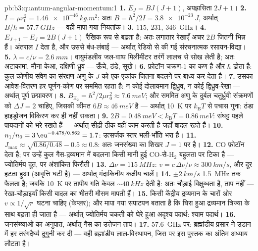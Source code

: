 \begin{solution}{pb:b3:quantum-angular-momentum:1}
\textbf{1.} $E_J = BJ(J+1)$, अपह्रासिता $2J + 1$।
\textbf{2.} $I = \mu r_0^2 = \qty{1.46e-46}{kg.m^2}$: अतः $B =
\hbar^2/2I = \qty{3.8e-23}{J}$, अर्थात् $B/h = \qty{57.7}{GHz}$ ---
वही मापा गया नियतांक।
\textbf{3.} $115$, $231$, \qty{346}{GHz}।
\textbf{4.} $E_{J+1} - E_J = 2B(J+1)$ रैखिक रूप से बढ़ता है: अतः
लगातार रेखाएँ अचर $2B$ जितनी भिन्न हैं। अंतराल $I$ देता है, और उससे
बंध-लंबाई --- अर्थात् रेडियो से की गई संरचनात्मक रसायन-विद्या।
\textbf{5.} $\lambda = c/\nu = \qty{2.6}{mm}$। वायुमंडलीय जल-वाष्प
मिलीमीटर तरंगें लालच से सोख लेती है; अतः अटाकामा, मौना केआ,
दक्षिणी ध्रुव --- ऊँचे, ठंडे, सूखे।
\textbf{6.} फ़ोटॉन चक्रण-$1$ का कण है और $\hbar$ ढोता है:
कुल कोणीय संवेग का संरक्षण अणु के $J$ को एक एकांक जितना बदलने पर
बाध्य कर देता है।
\textbf{7.} उसका आवेश-वितरण हर घूर्णन-कोण पर सममित रहता है: न कोई
दोलायमान द्विध्रुव, न कोई द्विध्रुव-रेखा --- अर्थात् पूर्ण
छद्मावरण।
\textbf{8.} $B_{\text{H}_2} = \hbar^2/2\mu r_0^2 \approx
\qty{7.6}{meV}$; और सममित अणु के दुर्बल चतुर्ध्रुवी
संक्रमणों को $\Delta J = 2$ चाहिए, जिसकी कीमत $6B \approx
\qty{46}{meV}$ है --- अर्थात् \qty{10}{K} पर $k_{\text{B}}T$ से पचास
गुना: ठंडा हाइड्रोजन विकिरण कर ही नहीं सकता।
\textbf{9.} $2B = \qty{0.48}{meV} < k_{\text{B}}T = \qty{0.86}{meV}$:
संघट्ट पहले पायदानों को भरे रखते हैं --- अर्थात् सीढ़ी ठीक वहीं काम
करती है जहाँ बादल रहते हैं।
\textbf{10.} $n_1/n_0 = 3\,\eu^{-0.478/0.862} = 1.7$: उत्सर्जक
स्तर भली-भाँति भरा है।
\textbf{11.} $J_{\max} \approx \sqrt{0.86/0.48} - 0.5 \approx 0.8$:
अतः जनसंख्या का शिखर $J = 1$ पर है।
\textbf{12.} CO फ़ोटॉन देता है; पर उन्हें कुल गैस-द्रव्यमान में
बदलना किसी मानी हुई CO-से-H$_2$ बहुलता पर टिका है --- ज्योतिर्मय
दूत, पर अंशांकित फिरौती।
\textbf{13.} $\Delta\nu = \qty{115}{MHz}$: $v = c\,\Delta\nu/\nu
\approx \qty{300}{km/s}$, और दूर हटता हुआ (आवृत्ति घटी है) ---
अर्थात् मंदाकिनीय कक्षीय चालें।
\textbf{14.} $\pm\qty{2}{km/s}$ \qty{1.5}{MHz} तक फैलता है; जबकि
\qty{10}{K} पर तापीय गति केवल $\sim\qty{40}{kHz}$ देती है: अतः
चौड़ाई विक्षुब्धता है, ताप नहीं --- रेखा-चौड़ाइयाँ किसी बादल का
भीतरी मौसम मापती हैं।
\textbf{15.} किसी केंद्रीय द्रव्यमान के चारों ओर $v \propto 1/\sqrt r$
घटना चाहिए (केप्लर); और मापा गया सपाटपन बताता है कि घिरा हुआ
द्रव्यमान त्रिज्या के साथ बढ़ता ही जाता है --- अर्थात् ज्योतिर्मय
चकती को घेरे हुआ अदृश्य पदार्थ: श्याम पदार्थ।
\textbf{16.} जनसंख्याओं का अनुपात, अर्थात् गैस का उत्तेजन-ताप।
\textbf{17.} \qty{57.6}{GHz} पर: ब्रह्मांडीय प्रसार ने उड़ान में हर
तरंगदैर्घ्य दुगुनी कर दी --- वही ब्रह्मांडीय लाल-विस्थापन, जिस पर इस
पुस्तक का अंतिम अध्याय लौटता है।

\end{solution}
